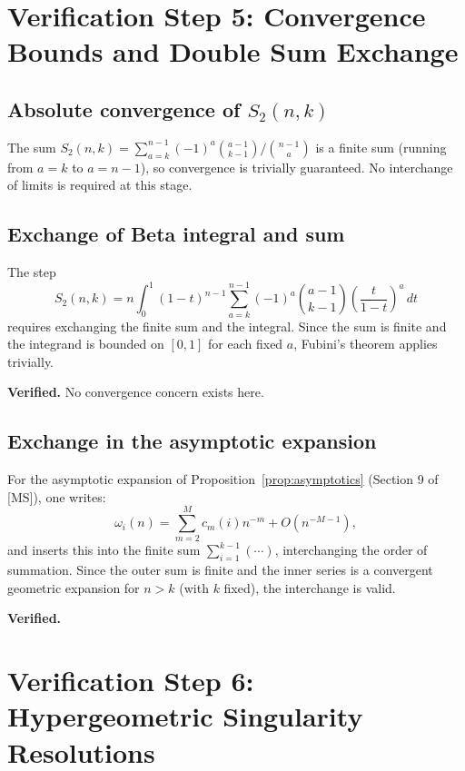 \documentclass[12pt, a4paper]{amsart}
\theoremstyle{plain}
\theoremstyle{definition}
\theoremstyle{remark}
\begin{document}
\section{Verification Step 5: Convergence Bounds and Double Sum Exchange}
\label{sec:step5}

\subsection{Absolute convergence of $S_2(n,k)$}

The sum $S_2(n,k) = \sum_{a=k}^{n-1}(-1)^a\binom{a-1}{k-1}/\binom{n-1}{a}$
is a finite sum (running from $a=k$ to $a=n-1$), so convergence is trivially
guaranteed.  No interchange of limits is required at this stage.

\subsection{Exchange of Beta integral and sum}

The step
\[
  S_2(n,k)
  = n\int_0^1(1-t)^{n-1}\sum_{a=k}^{n-1}(-1)^a\binom{a-1}{k-1}
    \left(\frac{t}{1-t}\right)^a\,dt
\]
requires exchanging the finite sum and the integral.  Since the sum is finite
and the integrand is bounded on $[0,1]$ for each fixed $a$, Fubini's theorem
applies trivially.

\textcolor{verified}{\textbf{Verified.}}  No convergence concern exists here.

\subsection{Exchange in the asymptotic expansion}

For the asymptotic expansion of Proposition~\ref{prop:asymptotics} (Section 9 of [MS]),
one writes:
\[
  \omega_i(n) = \sum_{m=2}^{M} c_m(i) n^{-m} + O(n^{-M-1}),
\]
and inserts this into the finite sum $\sum_{i=1}^{k-1}(\cdots)$, interchanging
the order of summation.  Since the outer sum is finite and the inner series is
a convergent geometric expansion for $n>k$ (with $k$ fixed), the interchange is valid.

\textcolor{verified}{\textbf{Verified.}}

\section{Verification Step 6: Hypergeometric Singularity Resolutions}
\label{sec:step6}
\end{document}
